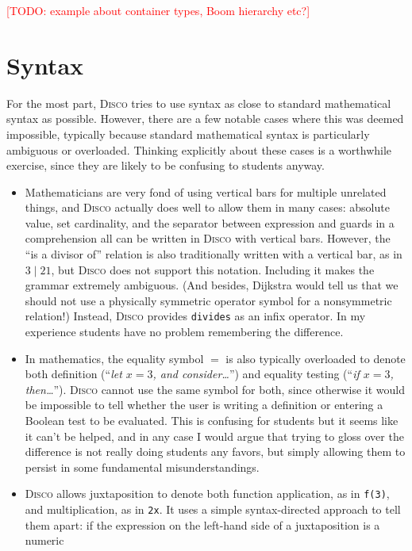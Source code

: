\documentclass[submission,copyright,creativecommons]{eptcs}
\newcommand{\disco}{\textsc{Disco}\xspace}
\newcommand{\todo}[1]{\textcolor{red}{[TODO: #1]}}
\newcommand{\todo}[1]{}
\begin{document}
\todo{example about container types, Boom hierarchy etc?}

\section{Syntax}
\label{sec:syntax}

For the most part, \disco tries to use syntax as close to standard
mathematical syntax as possible.  However, there are a few notable
cases where this was deemed impossible, typically because standard
mathematical syntax is particularly ambiguous or overloaded.  Thinking
explicitly about these cases is a worthwhile exercise, since they are
likely to be confusing to students anyway.

\begin{itemize}
\item Mathematicians are very fond of using vertical bars for multiple
  unrelated things, and \disco actually does well to allow them in
  many cases: absolute value, set cardinality, and the separator
  between expression and guards in a comprehension all can be written
  in \disco with vertical bars.  However, the ``is a divisor of''
  relation is also traditionally written with a vertical bar, as in
  $3 \mid 21$, but \disco does not support this notation.  Including
  it makes the grammar extremely ambiguous.  (And besides, Dijkstra
  would tell us that we should not use a physically symmetric operator
  symbol for a nonsymmetric relation!) Instead, \disco provides
  \texttt{divides} as an infix operator.  In my experience students
  have no problem remembering the difference.
\item In mathematics, the equality symbol $=$ is also typically
  overloaded to denote both definition (``\emph{let $x = 3$, and
    consider\dots}'') and equality testing (``\emph{if $x = 3$,
    then\dots}'').  \disco cannot use the same symbol for both, since
  otherwise it would be impossible to tell whether the user is writing
  a definition or entering a Boolean test to be evaluated.  This is
  confusing for students but it seems like it can't be helped, and in
  any case I would argue that trying to gloss over the difference is
  not really doing students any favors, but simply allowing them to
  persist in some fundamental misunderstandings.
\item \disco allows juxtaposition to denote both function application,
  as in \texttt{f(3)}, and multiplication, as in \texttt{2x}.  It uses
  a simple syntax-directed approach to tell them apart: if the
  expression on the left-hand side of a juxtaposition is a numeric

\end{itemize}
\end{document}
